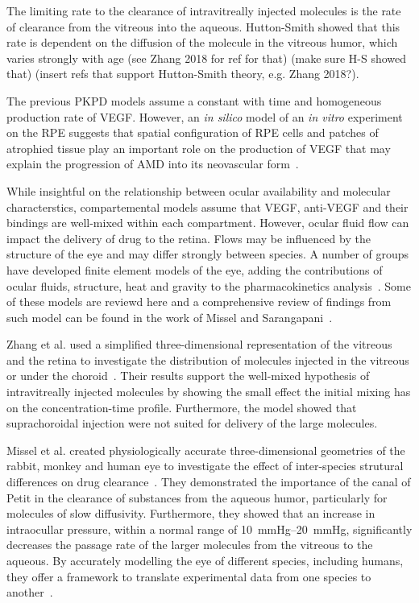 \documentclass[11pt,a4paper]{article}
\begin{document}
The limiting rate to the clearance of intravitreally injected molecules is the rate of clearance from the vitreous into the aqueous.
Hutton-Smith showed that this rate is dependent on the diffusion of the molecule in the vitreous humor, which varies strongly with age (see Zhang 2018 for ref for that) (make sure H-S showed that) (insert refs that support Hutton-Smith theory, e.g. Zhang 2018?).

The previous PKPD models assume a constant with time and homogeneous production rate of VEGF.
However, an \textit{in silico} model of an \textit{in vitro} experiment on the RPE suggests that spatial configuration of RPE cells and patches of atrophied tissue play an important role on the production of VEGF that may explain the progression of AMD into its neovascular form~\cite{Baker_2017}.  

While insightful on the relationship between ocular availability and molecular characterstics, compartemental models assume that VEGF, anti-VEGF and their bindings are well-mixed within each compartment.
However, ocular fluid flow can impact the delivery of drug to the retina.
Flows may be influenced by the structure of the eye and may differ strongly between species.
A number of groups have developed finite element models of the eye, adding the contributions of ocular fluids, structure, heat and gravity to the pharmacokinetics analysis~\cite{Lamminsalo_2018, Missel_2012, Zhang_2018}.
Some of these models are reviewd here and a comprehensive review of findings from such model can be found in the work of Missel and Sarangapani~\cite{Missel_2019}.

Zhang et al. used a simplified three-dimensional representation of the vitreous and the retina to investigate the distribution of molecules injected in the vitreous or under the choroid~\cite{Zhang_2018}.
Their results support the well-mixed hypothesis of intravitreally injected molecules by showing the small effect the initial mixing has on the concentration-time profile.
Furthermore, the model showed that suprachoroidal injection were not suited for delivery of the large molecules.

Missel et al. created physiologically accurate three-dimensional geometries of the rabbit, monkey and human eye to investigate the effect of inter-species strutural differences on drug clearance~\cite{Missel_2012}.  
They demonstrated the importance of the canal of Petit in the clearance of substances from the aqueous humor, particularly for molecules of slow diffusivity. 
Furthermore, they showed that an increase in intraocullar pressure, within a normal range of \SIrange{10}{20}{\mmHg}, significantly decreases the passage rate of the larger molecules from the vitreous to the aqueous.
By accurately modelling the eye of different species, including humans, they offer a framework to translate experimental data from one species to another~\cite{Missel_2012}.
\end{document}
